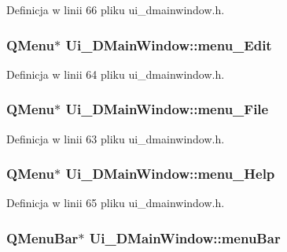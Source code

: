 Definicja w linii 66 pliku ui\-\_\-dmainwindow.\-h.

\hypertarget{class_ui___d_main_window_a8826a3e34a5aa75fca2b8e45b7010a8b}{
\subsubsection[{menu\-\_\-\-Edit}]{\setlength{\rightskip}{0pt plus 5cm}Q\-Menu$\ast$ Ui\-\_\-\-D\-Main\-Window\-::menu\-\_\-\-Edit}}\label{class_ui___d_main_window_a8826a3e34a5aa75fca2b8e45b7010a8b}


Definicja w linii 64 pliku ui\-\_\-dmainwindow.\-h.

\hypertarget{class_ui___d_main_window_a991f4d15852faf04d8c12694b3e077ad}{
\subsubsection[{menu\-\_\-\-File}]{\setlength{\rightskip}{0pt plus 5cm}Q\-Menu$\ast$ Ui\-\_\-\-D\-Main\-Window\-::menu\-\_\-\-File}}\label{class_ui___d_main_window_a991f4d15852faf04d8c12694b3e077ad}


Definicja w linii 63 pliku ui\-\_\-dmainwindow.\-h.

\hypertarget{class_ui___d_main_window_ac2997077098614d72b21d29c7a48350c}{
\subsubsection[{menu\-\_\-\-Help}]{\setlength{\rightskip}{0pt plus 5cm}Q\-Menu$\ast$ Ui\-\_\-\-D\-Main\-Window\-::menu\-\_\-\-Help}}\label{class_ui___d_main_window_ac2997077098614d72b21d29c7a48350c}


Definicja w linii 65 pliku ui\-\_\-dmainwindow.\-h.

\hypertarget{class_ui___d_main_window_a788ef749d82ca070e467e55cca0d47dd}{
\subsubsection[{menu\-Bar}]{\setlength{\rightskip}{0pt plus 5cm}Q\-Menu\-Bar$\ast$ Ui\-\_\-\-D\-Main\-Window\-::menu\-Bar}}\label{class_ui___d_main_window_a788ef749d82ca070e467e55cca0d47dd}


